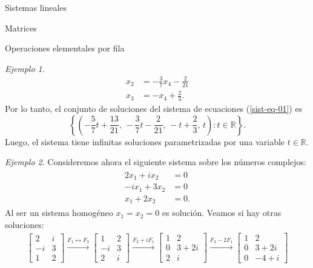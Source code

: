 \documentclass[a4paper,12pt,twoside,spanish,reqno]{amsbook}
\numberwithin{equation}{section}
\theoremstyle{definition}
\theoremstyle{remark}
\newtheorem*{ejemplo*}{Ejemplo}
\newcommand{\R}{\mathbb R}
\begin{document}
\begin{chapter}{Sistemas lineales}
\begin{section}{Matrices}
\begin{subsection}{Operaciones elementales por fila}
\begin{ejemplo*}
\begin{align*}
                    x_2  &=- \frac{3}{7}x_4 -\frac{2}{21} \\
                    x_3  &= -x_4+\frac{2}{3}. 
                    \end{align*}
                    Por lo tanto, el conjunto de soluciones del sistema de ecuaciones (\ref{sist-eq-01}) es
                    $$
                    \left\{(-\frac{5}{7}t+ \frac{13}{21},\,- \frac{3}{7}t-\frac{2}{21},\, -t+\frac{2}{3},\,t): t \in \R \right\}.
                    $$
                    Luego, el sistema tiene infinitas soluciones parametrizadas por una variable $t \in \R$.
                \end{ejemplo*}
                
                
                \begin{ejemplo*}
                    Consideremos ahora el siguiente sistema sobre los números complejos:
                    \begin{align}\label{sist-eq-03}
                    \begin{split}
                    2x_1 +i x_2 &= 0 \\
                    -ix_1 +3x_2  &=0 \\
                    x_1 +2x_2  &= 0.
                    \end{split}
                    \end{align}
                    Al ser un sistema homogéneo $x_1=x_2 = 0$ es solución. Veamos si hay otras soluciones: 
                    \begin{multline*}
                    \begin{bmatrix} 2&i \\ -i&3 \\ 1&2 \end{bmatrix}
                    \stackrel{F_1\leftrightarrow F_3}{\longrightarrow} 
                    \begin{bmatrix} 1&2 \\ -i&3 \\ 2&i \end{bmatrix}
                    \stackrel{F_2+iF_1}{\longrightarrow} 
                    \begin{bmatrix} 1&2 \\ 0&3+2i \\ 2&i \end{bmatrix}
                    \stackrel{F_3-2F_1}{\longrightarrow} 
                    \begin{bmatrix} 1&2 \\ 0&3+2i \\ 0&-4+i \end{bmatrix}

\end{multline*}
\end{ejemplo*}
\end{subsection}
\end{section}
\end{chapter}
\end{document}
